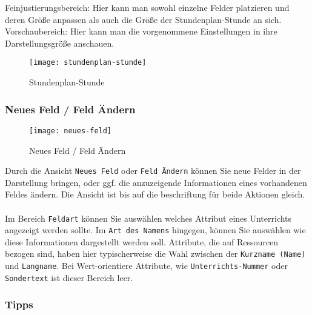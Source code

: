 \noindent
Feinjustierungsbereich: Hier kann man sowohl einzelne Felder platzieren und deren Größe anpassen als auch die Größe der Stundenplan-Stunde an sich.\\

\noindent
Vorschaubereich: Hier kann man die vorgenommene Einstellungen in ihre Darstellungsgröße anschauen.\\

\begin{figure}[h]
	\centering
	\texttt{[image: stundenplan-stunde]}
	\vspace{-5pt}
	\caption{Stundenplan-Stunde}
	\label{fig:stundenplan-stunde}
\end{figure}

\newpage

\subsubsection{Neues Feld / Feld Ändern}

\begin{wrapfigure}{r}{0.4\textwidth}
	\vspace{-14pt}
	\centering
	\texttt{[image: neues-feld]}
	\vspace{-5pt}
	\caption{Neues Feld / Feld Ändern}
	\label{fig:neues-feld}
	\vspace{-25pt}
\end{wrapfigure}

Durch die Ansicht \texttt{Neues Feld} oder \texttt{Feld Ändern} können Sie neue Felder in der Darstellung bringen, oder ggf. die anzuzeigende Informationen eines vorhandenen Feldes ändern. Die Ansicht ist bis auf die beschriftung für beide Aktionen gleich.\\
\\
Im Bereich \texttt{Feldart} können Sie auswählen welches Attribut eines Unterrichts angezeigt werden sollte. Im \texttt{Art des Namens} hingegen, können Sie auswählen wie diese Informationen dargestellt werden soll. Attribute, die auf Ressourcen bezogen sind, haben hier typischerweise die Wahl zwischen der \texttt{Kurzname (Name)} und \texttt{Langname}. Bei Wert-orientiere Attribute, wie \texttt{Unterrichts-Nummer} oder \texttt{Sondertext} ist dieser Bereich leer.


\subsubsection{Tipps}

